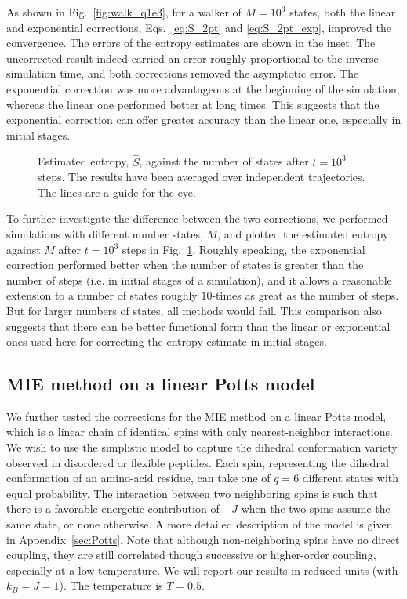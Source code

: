 \documentclass[reprint, superscriptaddress]{revtex4-1}
\begin{document}
As shown in Fig.~\ref{fig:walk_q1e3}, for a walker of $M = 10^3$ states,
both the linear and exponential corrections,
Eqs.~\eqref{eq:S_2pt} and \eqref{eq:S_2pt_exp},
improved the convergence.
%
The errors of the entropy estimates are shown in the inset.
%
The uncorrected result
indeed carried an error roughly proportional to the inverse simulation time,
and both corrections removed the asymptotic error.
%
The exponential correction was more advantageous
at the beginning of the simulation,
whereas the linear one performed better at long times.
%
This suggests that the exponential correction
can offer greater accuracy than the linear one,
especially in initial stages.


\begin{figure}[h]\centering
  \caption{
    \label{fig:walk_Svsq}
    Estimated entropy, $\hat S$,
    against the number of states
    after $t = 10^3$ steps.
    The results have been averaged over independent trajectories.
    The lines are a guide for the eye.
  }
\end{figure}

To further investigate the difference between the two corrections,
we performed simulations with different number states, $M$,
and plotted the estimated entropy against $M$
after $t = 10^3$ steps in Fig.~\ref{fig:walk_Svsq}.
%
Roughly speaking, the exponential correction performed better
when the number of states is greater than the number of steps
(i.e. in initial stages of a simulation),
and it allows a reasonable extension to
a number of states roughly $10$-times as great as the number of steps.
%
But for larger numbers of states, all methods would fail.
%
This comparison also suggests that there can be
better functional form than the linear or exponential ones used here
for correcting the entropy estimate in initial stages.



\subsection{MIE method on a linear Potts model}

We further tested the corrections for the MIE method
on a linear Potts model,
which is a linear chain of identical spins
with only nearest-neighbor interactions.
%
We wish to use the simplistic model
to capture the dihedral conformation variety
observed in disordered or flexible peptides.
%
Each spin, representing the dihedral conformation of an amino-acid residue,
can take one of $q = 6$ different states with equal probability.
%
The interaction between two neighboring spins
is such that there is a favorable energetic contribution of $-J$
when the two spins assume the same state, or none otherwise.
%
A more detailed description of the model is given in Appendix~\ref{sec:Potts}.
%
Note that although non-neighboring spins have no direct coupling,
they are still correlated though successive or higher-order coupling,
especially at a low temperature.
%
We will report our results in reduced units (with $k_B = J = 1$).
%
The temperature is $T = 0.5$.
\end{document}
